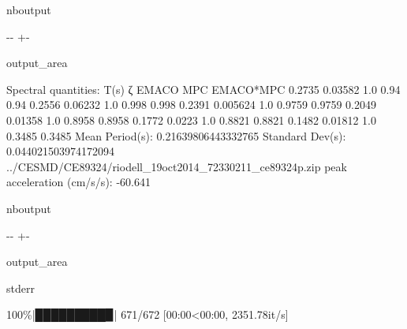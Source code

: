 \documentclass[letterpaper,10pt,english]{sphinxmanual}
\begin{document}
\begin{sphinxuseclass}{nboutput}
{

\kern-\sphinxverbatimsmallskipamount\kern-\baselineskip
\kern+\FrameHeightAdjust\kern-\fboxrule
\vspace{\nbsphinxcodecellspacing}

\begin{sphinxuseclass}{output_area}
\begin{sphinxuseclass}{}


\begin{sphinxVerbatim}[commandchars=\\\{\}]
Spectral quantities:
       T(s)        ζ        EMACO        MPC     EMACO*MPC
      0.2735     0.03582    1.0        0.94       0.94
      0.2556     0.06232    1.0        0.998      0.998
      0.2391     0.005624   1.0        0.9759     0.9759
      0.2049     0.01358    1.0        0.8958     0.8958
      0.1772     0.0223     1.0        0.8821     0.8821
      0.1482     0.01812    1.0        0.3485     0.3485
Mean Period(s): 0.21639806443332765
Standard Dev(s): 0.044021503974172094
../CESMD/CE89324/riodell\_19oct2014\_72330211\_ce89324p.zip
peak acceleration (cm/s/s): -60.641
\end{sphinxVerbatim}



\end{sphinxuseclass}
\end{sphinxuseclass}
}

\end{sphinxuseclass}
\begin{sphinxuseclass}{nboutput}
{

\kern-\sphinxverbatimsmallskipamount\kern-\baselineskip
\kern+\FrameHeightAdjust\kern-\fboxrule
\vspace{\nbsphinxcodecellspacing}

\begin{sphinxuseclass}{output_area}
\begin{sphinxuseclass}{stderr}


\begin{sphinxVerbatim}[commandchars=\\\{\}]
100\%|█████████▉| 671/672 [00:00<00:00, 2351.78it/s]
\end{sphinxVerbatim}



\end{sphinxuseclass}
\end{sphinxuseclass}
}

\end{sphinxuseclass}
\end{document}
